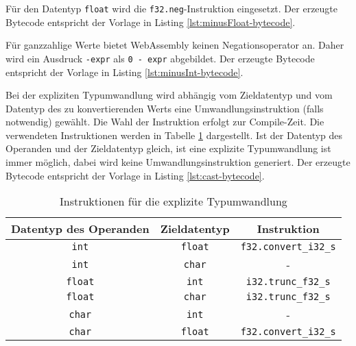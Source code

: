 Für den Datentyp \lstinline{float} wird die \lstinline{f32.neg}-Instruktion eingesetzt. Der erzeugte Bytecode entspricht der Vorlage in Listing \ref{lst:minusFloat-bytecode}.



Für ganzzahlige Werte bietet WebAssembly keinen Negationsoperator an. Daher wird ein Ausdruck \lstinline{-expr} als \lstinline{0 - expr} abgebildet. Der erzeugte Bytecode entspricht der Vorlage in Listing \ref{lst:minusInt-bytecode}.



Bei der expliziten Typumwandlung wird abhängig vom Zieldatentyp und vom Datentyp des zu konvertierenden Werts eine Umwandlungsinstruktion (falls notwendig) gewählt. Die Wahl der Instruktion erfolgt zur Compile-Zeit. Die verwendeten Instruktionen werden in Tabelle \ref{tab:castOperators} dargestellt. Ist der Datentyp des Operanden und der Zieldatentyp gleich, ist eine explizite Typumwandlung ist immer möglich, dabei wird keine Umwandlungsinstruktion generiert. Der erzeugte Bytecode entspricht der Vorlage in Listing \ref{lst:cast-bytecode}.

\begin{table}[]
    \centering
    \begin{tabular}{| c | c | c |}
        \hline
        Datentyp des Operanden & Zieldatentyp & Instruktion \\
        \hline
        {\lstinline!int!} & {\lstinline!float!} & {\lstinline!f32.convert_i32_s!} \\
        {\lstinline!int!} & {\lstinline!char!} & - \\
        {\lstinline!float!} & {\lstinline!int!} & {\lstinline!i32.trunc_f32_s!} \\
        {\lstinline!float!} & {\lstinline!char!} & {\lstinline!i32.trunc_f32_s!} \\
        {\lstinline!char!} & {\lstinline!int!} & - \\
        {\lstinline!char!} & {\lstinline!float!} & {\lstinline!f32.convert_i32_s!} \\
        \hline
    \end{tabular}
    \caption{Instruktionen für die explizite Typumwandlung}
    \label{tab:castOperators}
\end{table}

